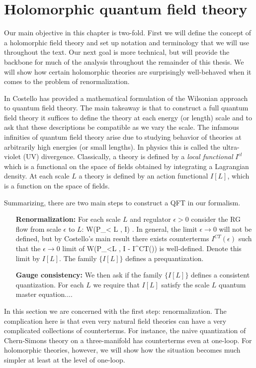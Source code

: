 \chapter{Holomorphic quantum field theory}

Our main objective in this chapter is two-fold. 
First we will define the concept of a holomorphic field theory and set up notation and terminology that we will use throughout the text. 
Our next goal is more technical, but will provide the backbone for much of the analysis throughout the remainder of this thesis.
We will show how certain holomorphic theories are surprisingly well-behaved when it comes to the problem of renormalization. 

In \cite{CostelloRenormalization} Costello has provided a mathematical formulation of the Wilsonian approach to quantum field theory.
The main takeaway is that to construct a full quantum field theory it suffices to define the theory at each energy (or length) scale and to ask that these descriptions be compatible as we vary the scale.
The infamous infinities of quantum field theory arise due to studying behavior of theories at arbitrarily high energies (or small lengths). 
In physics this is called the ultra-violet (UV) divergence. 
Classically, a theory is defined by a {\em local functional} $I^{cl}$ which is a functional on the space of fields obtained by integrating a Lagrangian density.
At each scale $L$ a theory is defined by an action functional $I[L]$, which is a function on the space of fields. 

Summarizing, there are two main steps to construct a QFT in our formalism.
\begin{itemize}
\item[{\bf Renormalization:}] For each scale $L$ and regulator $\epsilon > 0$ consider the RG flow from scale $\epsilon$ to $L$:
\be
W(P_{\epsilon < L} , I) .
\ee
In general, the limit $\epsilon \to 0$ will not be defined, but by Costello's main result there exists counterterms $I^{CT}(\epsilon)$ such that the $\epsilon \to 0$ limit of 
\ben
W(P_{\epsilon<L} , I - I^{CT}(\epsilon))
\een
is well-defined. 
Denote this limit by $I[L]$.
The family $\{I[L]\}$ defines a prequantization.
\item[{\bf Gauge consistency:}] We then ask if the family $\{I[L]\}$ defines a consistent quantization.
For each $L$ we require that $I[L]$ satisfy the scale $L$ quantum master equation....
\end{itemize}

In this section we are concerned with the first step: renormalization. 
The complication here is that even very natural field theories can have a very complicated collections of counterterms. 
For instance, the naive quantization of Chern-Simons theory on a three-manifold has counterterms even at one-loop. 
For holomorphic theories, however, we will show how the situation becomes much simpler at least at the level of one-loop.  

